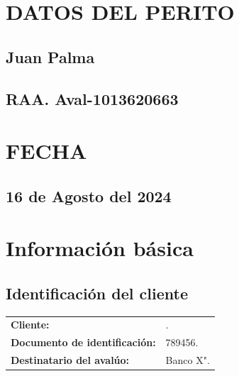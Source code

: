 \documentclass[12pt,a4paper,twoside]{article}
\begin{document}
\bigskip 
\bigskip 
\bigskip 
\bigskip 
\bigskip 
\bigskip 

\section*{DATOS DEL PERITO}

\subsection*{Juan Palma}
\subsection*{RAA. Aval-1013620663}

\bigskip 
\bigskip 
\bigskip 
\bigskip 
\bigskip 
\bigskip 

\section*{FECHA}

\subsection*{16 de Agosto del 2024}
	


\clearpage

\tableofcontents

\clearpage


\section{Información básica}


\subsection{Identificación del cliente}

\begin{tabular}{ l p{7.5cm} }
	
	\textbf{Cliente:} & \Propietarios. \\
	\textbf{Documento de identificación:} & 789456.\\
	\textbf{Destinatario del avalúo:} & Banco X". \\
	
\end{tabular}
\end{document}
